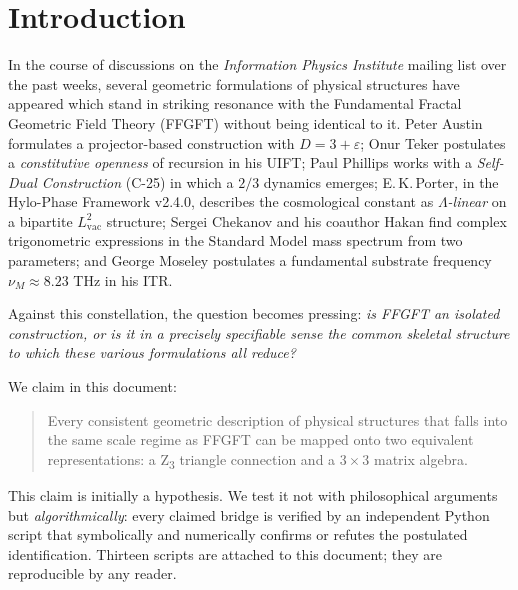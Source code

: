 
\section{Introduction}
\label{sec:intro}

In the course of discussions on the \emph{Information Physics Institute} mailing list over the past weeks, several geometric formulations of physical structures have appeared which stand in striking resonance with the Fundamental Fractal Geometric Field Theory (FFGFT) without being identical to it. Peter Austin formulates a projector-based construction with \(D = 3 + \varepsilon\); Onur Teker postulates a \emph{constitutive openness} of recursion in his UIFT; Paul Phillips works with a \emph{Self-Dual Construction} (C-25) in which a \(2/3\) dynamics emerges; E.\,K.\,Porter, in the Hylo-Phase Framework v2.4.0, describes the cosmological constant as \emph{\(\Lambda\)-linear} on a bipartite \(L_\text{vac}^2\) structure; Sergei Chekanov and his coauthor Hakan find complex trigonometric expressions in the Standard Model mass spectrum from two parameters; and George Moseley postulates a fundamental substrate frequency \(\nu_M \approx 8.23\) THz in his ITR.

Against this constellation, the question becomes pressing: \emph{is FFGFT an isolated construction, or is it in a precisely specifiable sense the common skeletal structure to which these various formulations all reduce?}

We claim in this document:
\begin{quote}
Every consistent geometric description of physical structures that falls into the same scale regime as FFGFT can be mapped onto two equivalent representations: a Z\textsubscript{3} triangle connection and a 3\,$\times$\,3 matrix algebra.
\end{quote}

This claim is initially a hypothesis. We test it not with philosophical arguments but \emph{algorithmically}: every claimed bridge is verified by an independent Python script that symbolically and numerically confirms or refutes the postulated identification. Thirteen scripts are attached to this document; they are reproducible by any reader.

